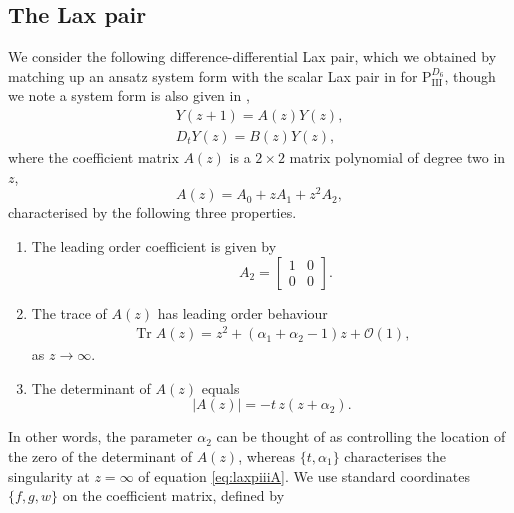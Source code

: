\documentclass[a4paper,reqno]{amsart}
\numberwithin{equation}{section}
\numberwithin{figure}{section}
\theoremstyle{remark}
\newcommand\Pthree{\textrm{P}_{\textrm{III}}}
\begin{document}
\subsection{The Lax pair} \label{subsect:linP3d6}
We consider the following difference-differential Lax pair, which we obtained by matching up an ansatz system form with the scalar Lax pair in \cite{KNY2017} for $\Pthree^{D_6}$, though we note a system form is also given in \cite[\S 7]{adler94},
\begin{subequations}\label{eq:laxpiii}
\begin{align}
    Y(z+1)=A(z)Y(z),\label{eq:laxpiiiA}\\
    D_t Y(z)=B(z)Y(z),\label{eq:laxpiiiB}
\end{align}
\end{subequations}
where the coefficient matrix $A(z)$ is a $2\times 2$ matrix polynomial of degree two in $z$,
\begin{equation}\label{eq:piiiAseries}
        A(z)=A_0+z A_1+z^2A_2,
    \end{equation}
    characterised by the following three properties.
\begin{enumerate}[label=(\roman*)]
\item The leading order coefficient is given by
\begin{equation*}
    \qquad A_2=\begin{bmatrix}
            1 & 0\\
            0 & 0
        \end{bmatrix}.
\end{equation*}
    \item The trace of $A(z)$ has leading order behaviour
   \begin{equation}\label{eq:traceinfpiii}
    \begin{aligned}
     \operatorname{Tr}A(z)=z^2+(\alpha_1+\alpha_2-1)z+\mathcal{O}(1),
    \end{aligned}
   \end{equation}
    as $z\rightarrow \infty$.
    \item The determinant of $A(z)$ equals
\begin{equation}\label{eq:coefmatrixdetpiii}
    |A(z)|=-t\,z(z+\alpha_2).
\end{equation}
\end{enumerate}
In other words, the parameter $\alpha_2$ can be thought of as controlling the location of the zero of the determinant of $A(z)$, whereas $\{t,\alpha_1\}$ characterises the singularity at $z=\infty$ of equation \eqref{eq:laxpiiiA}. We use standard coordinates $\{f,g,w\}$ on the coefficient matrix, defined by 
\end{document}
